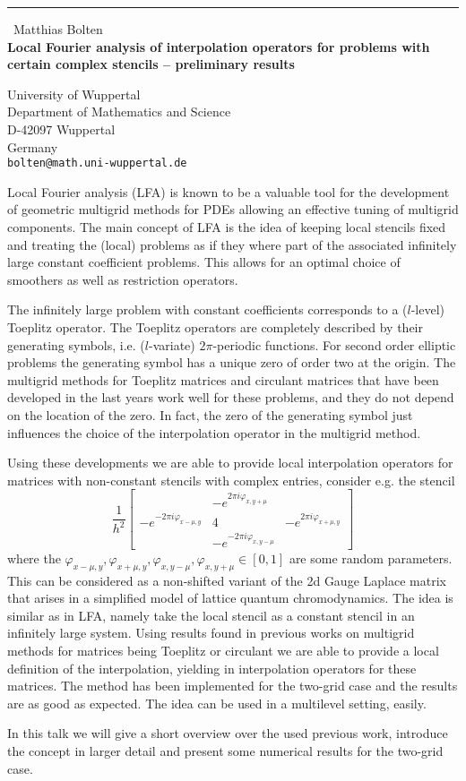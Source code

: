 \documentclass{report}
\begin{document}
\begin{center}
\rule{6in}{1pt} \
{\large Matthias Bolten \\
{\bf Local Fourier analysis of interpolation operators for problems with certain complex stencils -- preliminary results}}

University of Wuppertal \\ Department of Mathematics and Science \\ D-42097 Wuppertal \\ Germany
\\
{\tt bolten@math.uni-wuppertal.de}\end{center}

Local Fourier analysis (LFA) is known to be a valuable tool for the
development of geometric multigrid methods for PDEs allowing an effective
tuning of multigrid components. The main concept of LFA is the idea of
keeping local stencils fixed and treating the (local) problems as if they
where part of the associated infinitely large constant coefficient
problems. This allows for an optimal choice of smoothers as well as
restriction operators.

The infinitely large problem with constant coefficients corresponds to a
($l$-level) Toeplitz operator. The Toeplitz operators are completely
described by their generating symbols, i.e. ($l$-variate) $2
\pi$-periodic functions. For second order elliptic problems the
generating symbol has a unique zero of order two at the origin. The
multigrid methods for Toeplitz matrices and circulant matrices that have
been developed in the last years work well for these problems, and they
do not depend on the location of the zero. In fact, the zero of the
generating symbol just influences the choice of the interpolation
operator in the multigrid method.

Using these developments we are able to provide local interpolation
operators for matrices with non-constant stencils with complex entries,
consider e.g. the stencil
\begin{equation*}
\frac{1}{h^{2}} \left[ \begin{array}{ccc}
& -e^{2 \pi i \varphi_{x,y+\mu}} & \\
-e^{-2 \pi i \varphi_{x-\mu,y}} & 4 & -e^{2 \pi i \varphi_{x+\mu,y}} \\
& -e^{-2 \pi i \varphi_{x,y-\mu}} &
\end{array} \right]
\end{equation*}
where the $\varphi_{x-\mu,y}, \varphi_{x+\mu,y}, \varphi_{x,y-\mu},
\varphi_{x,y+\mu} \in [0,1]$ are some random parameters. This can be
considered as a non-shifted variant of the 2d Gauge Laplace matrix that
arises in a simplified model of lattice quantum chromodynamics. The idea
is similar as in LFA, namely take the local stencil as a constant stencil
in an infinitely large system. Using results found in previous works on
multigrid methods for matrices being Toeplitz or circulant we are able to
provide a local definition of the interpolation, yielding in
interpolation operators for these matrices. The method has been
implemented for the two-grid case and the results are as good as
expected. The idea can be used in a multilevel setting, easily.

In this talk we will give a short overview over the used previous work,
introduce the concept in larger detail and present some numerical results
for the two-grid case.
\end{document}
